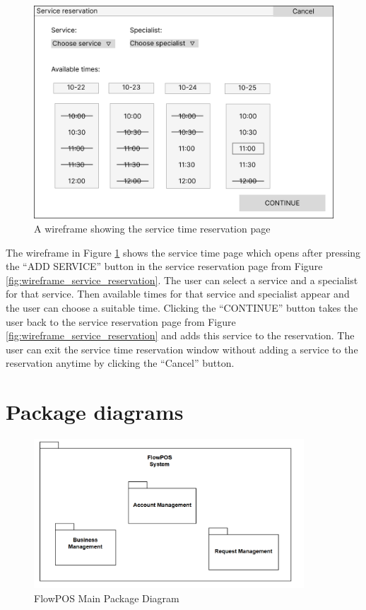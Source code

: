\documentclass[11pt,a4paper,pdftex]{article}
\begin{document}
\begin{figure}[H]
    \centering
    \includegraphics[width=1\linewidth]{wireframes/ServiceReservationTime.png}
    \caption{A wireframe showing the service time reservation page}
    \label{fig:wireframe_service_time}
\end{figure}

The wireframe in Figure \ref{fig:wireframe_service_time} shows the service time page which opens after pressing the \enquote{ADD SERVICE} button in the service reservation page from Figure \ref{fig:wireframe_service_reservation}. The user can select a service and a specialist for that service. Then available times for that service and specialist appear and the user can choose a suitable time. Clicking the \enquote{CONTINUE} button takes the user back to the service reservation page from Figure \ref{fig:wireframe_service_reservation} and adds this service to the reservation. The user can exit the service time reservation window without adding a service to the reservation anytime by clicking the \enquote{Cancel} button.

\section{Package diagrams}


\begin{figure}[H]
    \centering
    \includegraphics[width=0.9\textwidth]{graphics/Package8.png}
    \caption{FlowPOS Main Package Diagram}
    \label{fig:package1}
\end{figure}
\end{document}

